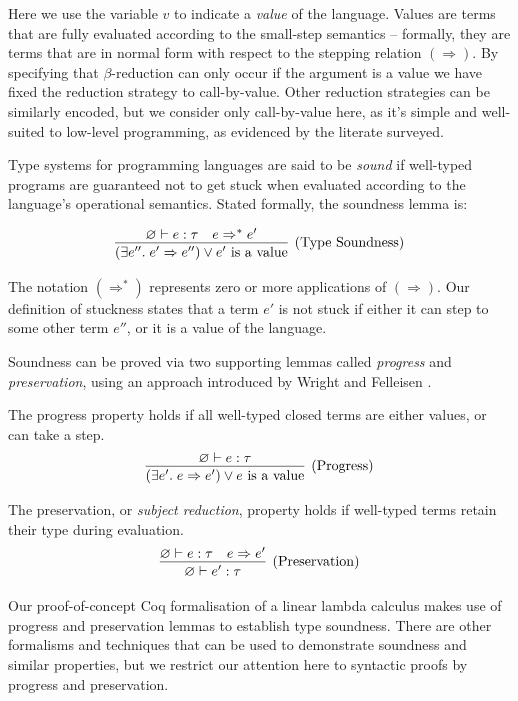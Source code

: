 \documentclass[]{unswthesis}
\let\emptyset\varnothing
\newcommand{\types}{\vdash}
\newcommand{\steps}{\Rightarrow}
\let\i\textit
\let\t\text
\begin{document}
Here we use the variable $v$ to indicate a \i{value} of the language. Values are terms that are fully evaluated according to the small-step semantics \cite{tapl} -- formally, they are terms that are in normal form with respect to the stepping relation $(\steps)$. By specifying that $\beta$-reduction can only occur if the argument is a value we have fixed the reduction strategy to call-by-value. Other reduction strategies can be similarly encoded, but we consider only call-by-value here, as it's simple and well-suited to low-level programming, as evidenced by the literate surveyed.

Type systems for programming languages are said to be \i{sound} if well-typed programs are guaranteed not to get stuck when evaluated according to the language's operational semantics. Stated formally, the soundness lemma is:

\begin{eqnarray*}
\infer[\t{(Type Soundness)}]
{(\exists e''. \; e' \steps e'') \lor \t{$e'$ is a value}}
{\emptyset \types e : \tau  &  e \steps^* e'}
\end{eqnarray*}

The notation $(\steps^*)$ represents zero or more applications of $(\steps)$. Our definition of stuckness states that a term $e'$ is not stuck if either it can step to some other term $e''$, or it is a value of the language.

Soundness can be proved via two supporting lemmas called \i{progress} and \i{preservation}, using an approach introduced by Wright and Felleisen \cite{wright94}.

The progress property holds if all well-typed closed terms are either values, or can take a step.
\begin{eqnarray*}
\infer[\t{(Progress)}]
{(\exists e'. \; e \steps e') \lor \t{$e$ is a value}}
{\emptyset \types e : \tau}
\end{eqnarray*}

The preservation, or \i{subject reduction}, property holds if well-typed terms retain their type during evaluation.
\begin{eqnarray*}
\infer[\t{(Preservation)}]
{\emptyset \types e' : \tau}
{\emptyset \types e : \tau  &  e \steps e'}
\end{eqnarray*}

Our proof-of-concept Coq formalisation of a linear lambda calculus makes use of progress and preservation lemmas to establish type soundness. There are other formalisms and techniques that can be used to demonstrate soundness and similar properties, but we restrict our attention here to syntactic proofs by progress and preservation.
\end{document}
